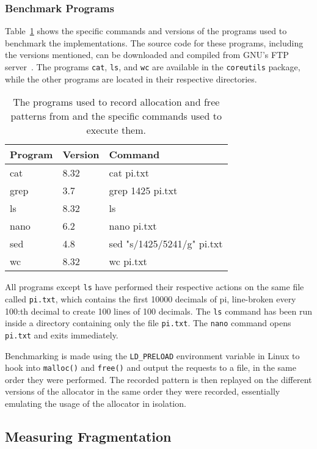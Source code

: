 \subsubsection{Benchmark Programs}

Table~\ref{table:pattern-programs} shows the specific commands and versions of the programs used to benchmark the implementations. The source code for these programs, including the versions mentioned, can be downloaded and compiled from GNU's FTP server~\cite{gnuftp}. The programs \texttt{cat}, \texttt{ls}, and \texttt{wc} are available in the \texttt{coreutils} package, while the other programs are located in their respective directories.

\begin{table}[h]
\centering
\begin{tabular}{llp{10.4cm}}
\textbf{Program} & \textbf{Version} & \textbf{Command} \\ \hline
cat  & 8.32 & cat pi.txt\\ \hline
grep & 3.7  & grep 1425 pi.txt\\ \hline
ls   & 8.32 & ls \\ \hline
nano & 6.2  & nano pi.txt\\ \hline
sed  & 4.8  & sed "s/1425/5241/g" pi.txt\\ \hline
wc   & 8.32 & wc pi.txt\\
\end{tabular}
\caption{The programs used to record allocation and free patterns from and the specific commands used to execute them.}
\label{table:pattern-programs}
\end{table}

All programs except \texttt{ls} have performed their respective actions on the same file called \texttt{pi.txt}, which contains the first 10000 decimals of pi, line-broken every 100:th decimal to create 100 lines of 100 decimals. The \texttt{ls} command has been run inside a directory containing only the file \texttt{pi.txt}. The \texttt{nano} command opens \texttt{pi.txt} and exits immediately.

Benchmarking is made using the \texttt{LD\_PRELOAD} environment variable in Linux to hook into \texttt{malloc()} and \texttt{free()} and output the requests to a file, in the same order they were performed. The recorded pattern is then replayed on the different versions of the allocator in the same order they were recorded, essentially emulating the usage of the allocator in isolation.

\subsection{Measuring Fragmentation}

